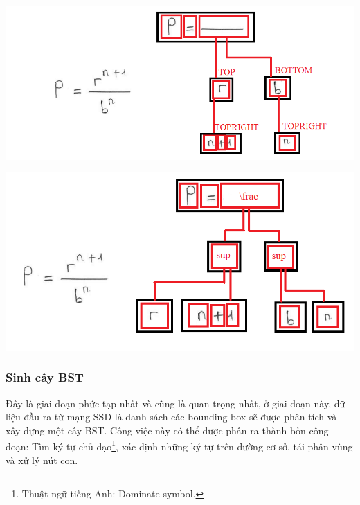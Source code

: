 \documentclass[a4paper,12pt]{article}
\begin{document}
	\begin{center}
		\centering
		\includegraphics[width=0.95\linewidth]{BST.png}
		\vspace{0.5cm}
	\end{center}	
	
	\begin{center}
		\centering
		\includegraphics[width=0.85\linewidth]{lexBST.png}
		\vspace{0.5cm}
	\end{center}
	
	
	
	\subsubsection{Sinh cây BST\cite{zanibbi}}
	
	Đây là giai đoạn phức tạp nhất và cũng là quan trọng nhất, ở giai đoạn này, dữ liệu đầu ra từ mạng SSD\cite{liu2016ssd} là danh sách các bounding box sẽ được phân tích và xây dựng một cây BST\cite{zanibbi}. Công việc này có thể được phân ra thành bốn công đoạn: Tìm ký tự chủ đạo\cite{zanibbi}\footnote{Thuật ngữ tiếng Anh: Dominate symbol.}, xác định những ký tự trên đường cơ sở, tái phân vùng và xử lý nút con.\\
	
\end{document}
